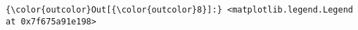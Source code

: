 \documentclass[11pt]{article}
\begin{document}
\begin{Verbatim}[commandchars=\\\{\}]
{\color{outcolor}Out[{\color{outcolor}8}]:} <matplotlib.legend.Legend at 0x7f675a91e198>
\end{Verbatim}
            
    \begin{center}
    \end{center}
    { \hspace*{\fill} \\}
    

    
    
    
    
\end{document}
